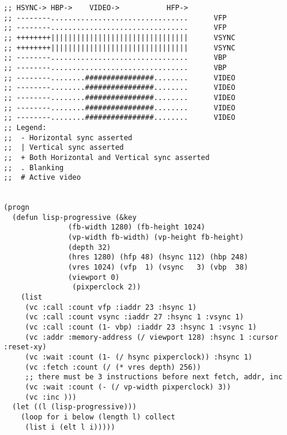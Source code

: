 \documentclass[%
  DIV19]{scrartcl}
\begin{document}
\begin{lstlisting}[label=some-code,caption=SBCL Code to talk to graphics card]
;; HSYNC-> HBP->    VIDEO->           HFP->
;; --------................................      VFP
;; --------................................      VFP
;; ++++++++||||||||||||||||||||||||||||||||      VSYNC
;; ++++++++||||||||||||||||||||||||||||||||      VSYNC
;; --------................................      VBP
;; --------................................      VBP
;; --------........################........      VIDEO
;; --------........################........      VIDEO
;; --------........################........      VIDEO
;; --------........################........      VIDEO
;; --------........################........      VIDEO
;; Legend:
;;  - Horizontal sync asserted
;;  | Vertical sync asserted
;;  + Both Horizontal and Vertical sync asserted
;;  . Blanking
;;  # Active video


(progn 
  (defun lisp-progressive (&key 
			   (fb-width 1280) (fb-height 1024)
			   (vp-width fb-width) (vp-height fb-height)
			   (depth 32)
			   (hres 1280) (hfp 48) (hsync 112) (hbp 248)
			   (vres 1024) (vfp  1) (vsync   3) (vbp  38)
			   (viewport 0) 
			    (pixperclock 2))
    (list
     (vc :call :count vfp :iaddr 23 :hsync 1)
     (vc :call :count vsync :iaddr 27 :hsync 1 :vsync 1)
     (vc :call :count (1- vbp) :iaddr 23 :hsync 1 :vsync 1)
     (vc :addr :memory-address (/ viewport 128) :hsync 1 :cursor :reset-xy)
     (vc :wait :count (1- (/ hsync pixperclock)) :hsync 1)
     (vc :fetch :count (/ (* vres depth) 256)) 
     ;; there must be 3 instructions before next fetch, addr, inc
     (vc :wait :count (- (/ vp-width pixperclock) 3))
     (vc :inc )))
  (let ((l (lisp-progressive)))
    (loop for i below (length l) collect
	 (list i (elt l i)))))
\end{lstlisting}
\end{document}
